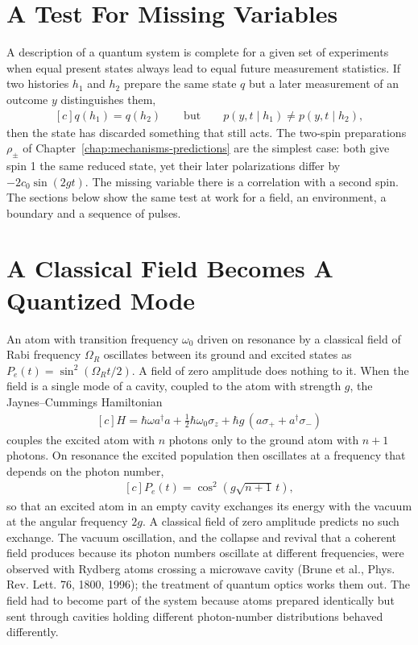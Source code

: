 \documentclass[11pt,oneside]{book}
\newenvironment{centeredalign}{\[\begin{gathered}[c]}{\end{gathered}\]}
\begin{document}
\section{A Test For Missing Variables}
A description of a quantum system is complete for a given set of experiments when equal present states always lead to
equal future measurement statistics. If two histories \(h_1\) and \(h_2\) prepare the same state \(q\) but a later
measurement of an outcome \(y\) distinguishes them,
\begin{centeredalign}
q(h_1)=q(h_2)\qquad\text{but}\qquad p(y,t\mid h_1)\ne p(y,t\mid h_2),
\end{centeredalign}
then the state has discarded something that still acts. The two-spin preparations \(\rho_\pm\) of
Chapter~\ref{chap:mechanisms-predictions} are the simplest case: both give spin 1 the same reduced state, yet their
later polarizations differ by \(-2c_0\sin(2gt)\). The missing variable there is a correlation with a second spin. The
sections below show the same test at work for a field, an environment, a boundary and a sequence of pulses.

\section{A Classical Field Becomes A Quantized Mode}
An atom with transition frequency \(\omega_0\) driven on resonance by a classical field of Rabi frequency \(\Omega_R\)
oscillates between its ground and excited states as \(P_e(t)=\sin^2(\Omega_Rt/2)\). A field of zero amplitude does
nothing to it. When the field is a single mode of a cavity, coupled to the atom with strength \(g\), the Jaynes--Cummings
Hamiltonian
\begin{centeredalign}
H=\hbar\omega a^\dagger a+\tfrac12\hbar\omega_0\sigma_z+\hbar g\,(a\sigma_++a^\dagger\sigma_-)
\end{centeredalign}
couples the excited atom with \(n\) photons only to the ground atom with \(n+1\) photons. On resonance the excited
population then oscillates at a frequency that depends on the photon number,
\begin{centeredalign}
P_e(t)=\cos^2\!\left(g\sqrt{n+1}\,t\right),
\end{centeredalign}
so that an excited atom in an empty cavity exchanges its energy with the vacuum at the angular frequency \(2g\). A
classical field of zero amplitude predicts no such exchange. The vacuum oscillation, and the collapse and revival that a
coherent field produces because its photon numbers oscillate at different frequencies, were observed with Rydberg atoms
crossing a microwave cavity (Brune et al., Phys. Rev. Lett. 76, 1800, 1996); the treatment of quantum optics works them
out. The field had to become part of the system because atoms prepared identically but sent through cavities holding
different photon-number distributions behaved differently.
\end{document}

